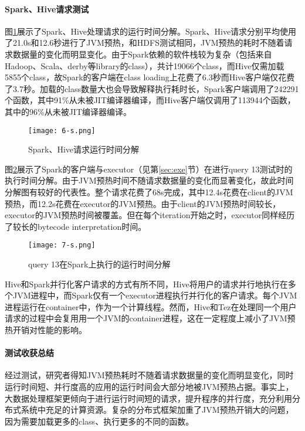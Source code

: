 \documentclass[lang=cn,12pt,a4paper,cite=authoryear]{elegantpaper}
\begin{document}
\paragraph{Spark、Hive请求测试}
图\ref{fig:br2}展示了Spark、Hive处理请求的运行时间分解。Spark、Hive请求分别平均使用了21.0s和12.6秒进行了JVM预热，和HDFS测试相同，JVM预热的耗时不随着请求数据量的变化而明显变化。由于Spark依赖的软件栈较为复杂（包括来自Hadoop、Scala、derby等library的class），共计19066个class，而Hive仅需加载5855个class，故Spark的客户端在class loading上花费了6.3秒而Hive客户端仅花费了3.7秒。加载的class数量大也会导致解释执行耗时长，Spark客户端调用了242291个函数，其中91\%从未被JIT编译器编译，而Hive客户端仅调用了113944个函数，其中的96\%从未被JIT编译器编译。

\begin{figure}[!htp]
  \centering
  \texttt{[image: 6-s.png]}
  \caption{Spark、Hive请求运行时间分解}
  \label{fig:br2}
\end{figure}

图\ref{fig:br3}展示了Spark的客户端与executor（见第\ref{sec:exe}节）在进行query 13测试时的执行时间分解。由于JVM预热时间不随请求数据量的变化而显著变化，故此时间分解图有较好的代表性。整个请求花费了68s完成，其中12.4s花费在client的JVM预热，而12.2s花费在executor的JVM预热。由于client的JVM预热时间较长，executor的JVM预热时间被覆盖。但在每个iteration开始之时，executor同样经历了较长的bytecode interpretation时间。

\begin{figure}[!htp]
  \centering
  \texttt{[image: 7-s.png]}
  \caption{query 13在Spark上执行的运行时间分解}
  \label{fig:br3}
\end{figure}

Hive和Spark并行化客户请求的方式有所不同，Hive将用户的请求并行地执行在多个JVM进程中，而Spark仅有一个executor进程执行并行化的客户请求。每个JVM进程运行在container中，作为一个计算线程。然而，Hive和Tez在处理同一个用户请求的过程中会复用用一个JVM的container进程，这在一定程度上减小了JVM预热开销对性能的影响。

\paragraph{测试收获总结}
经过测试，研究者得知JVM预热耗时不随着请求数据量的变化而明显变化，同时运行时间短、并行度高的应用的运行时间会大部分地被JVM预热占据。事实上，大数据处理框架更倾向于进行运行时间短的请求，提升程序的并行度，充分利用分布式系统中充足的计算资源。复杂的分布式框架加重了JVM预热开销大的问题，因为需要加载更多的class、执行更多的不同的函数。
\end{document}
